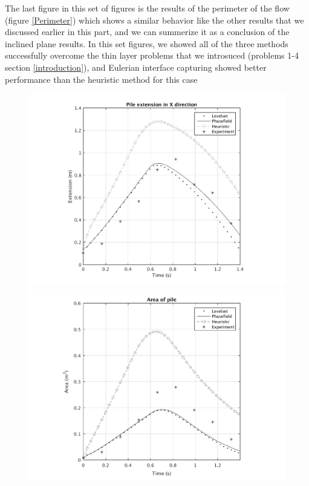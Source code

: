 \documentclass[letterpaper,10pt]{article}
\begin{document}
The last figure in this set of figures is the results of the perimeter of the flow (figure \ref{Perimeter}) which shows a similar behavior like the other results that we discussed earlier in this part, and we can summerize it as a conclusion of the inclined plane results. In this set figures, we showed all of the three methods successfully overcome the thin layer problems that we introsuced (problems 1-4 section \ref{introduction}), and Eulerian interface capturing showed better performance than the heuristic method for this case
\begin{figure}[H]
        \begin{minipage}[b]{.5\linewidth}
                \centering
                \includegraphics[scale=0.45]{IMAGES/xextend.png}
                  \label{x_extent}
                \includegraphics[scale=0.45]{IMAGES/area.png}

\end{minipage}
\end{figure}
\end{document}
